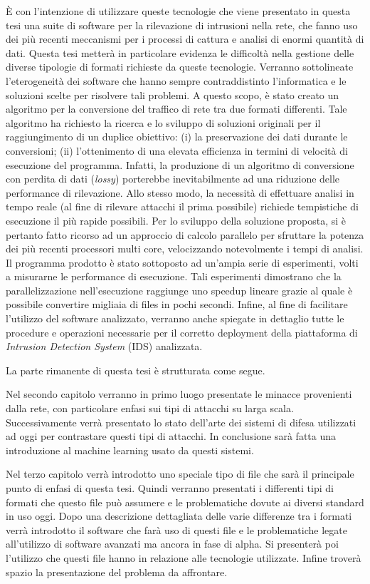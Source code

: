 \documentclass[../main.tex]{subfiles}
\begin{document}
È con l'intenzione di utilizzare queste tecnologie che viene presentato in questa tesi una suite di software per la rilevazione di intrusioni nella rete, che fanno uso dei più recenti meccanismi per i processi di cattura e analisi di enormi quantità di dati. Questa tesi metterà in particolare evidenza le difficoltà nella gestione delle diverse tipologie di formati richieste da queste tecnologie. Verranno sottolineate l'eterogeneità dei software che hanno sempre contraddistinto l'informatica e le soluzioni scelte per risolvere tali problemi. A questo scopo, è stato creato un algoritmo per la conversione del traffico di rete tra due formati differenti. Tale algoritmo ha richiesto la ricerca e lo sviluppo di soluzioni originali per il raggiungimento di un duplice obiettivo: (i) la preservazione dei dati durante le conversioni; (ii) l'ottenimento di una elevata efficienza in termini di velocità di esecuzione del programma. Infatti, la produzione di un algoritmo di conversione con perdita di dati (\textit{lossy}) porterebbe inevitabilmente ad una riduzione delle performance di rilevazione. Allo stesso modo, la necessità di effettuare analisi in tempo reale (al fine di rilevare attacchi il prima possibile) richiede tempistiche di esecuzione il più rapide possibili. Per lo sviluppo della soluzione proposta, si è pertanto fatto ricorso ad un approccio di calcolo parallelo per sfruttare la potenza dei più recenti processori multi core, velocizzando notevolmente i tempi di analisi. Il programma prodotto è stato sottoposto ad un'ampia serie di esperimenti, volti a misurarne le performance di esecuzione. Tali esperimenti dimostrano che la parallelizzazione nell'esecuzione raggiunge uno speedup lineare grazie al quale è possibile convertire migliaia di files in pochi secondi.
Infine, al fine di facilitare l'utilizzo del software analizzato, verranno anche spiegate in dettaglio tutte le procedure e operazioni necessarie per il corretto deployment della piattaforma di \textit{Intrusion Detection System} (IDS) analizzata.

La parte rimanente di questa tesi è strutturata come segue.

Nel secondo capitolo verranno in primo luogo presentate le minacce provenienti dalla rete, con particolare enfasi sui tipi di attacchi su larga scala. Successivamente verrà presentato lo stato dell'arte dei sistemi di difesa utilizzati ad oggi per contrastare questi tipi di attacchi. In conclusione sarà fatta una introduzione al machine learning usato da questi sistemi.

Nel terzo capitolo verrà introdotto uno speciale tipo di file che sarà il principale punto di enfasi di questa tesi. Quindi verranno presentati i differenti tipi di formati che questo file può assumere e le problematiche dovute ai diversi standard in uso oggi. Dopo una descrizione dettagliata delle varie differenze tra i formati verrà introdotto il software che farà uso di questi file e le problematiche legate all'utilizzo di software avanzati ma ancora in fase di alpha. Si presenterà poi l'utilizzo che questi file hanno in relazione alle tecnologie utilizzate. Infine troverà spazio la presentazione del problema da affrontare.
\end{document}
